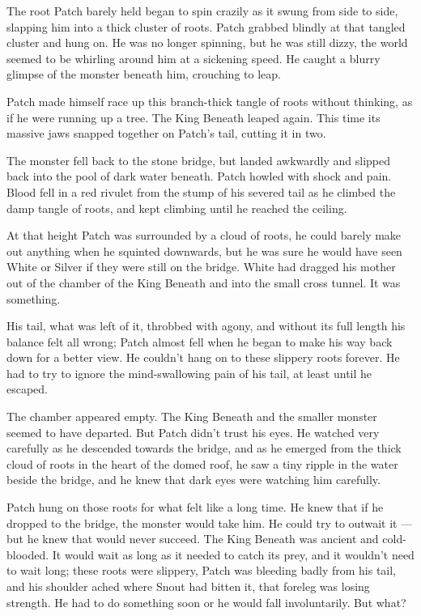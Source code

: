 \documentclass[12pt]{book}
\begin{document}
The root Patch barely held began to spin crazily as it swung from side
to side, slapping him into a thick cluster of roots. Patch grabbed
blindly at that tangled cluster and hung on. He was no longer
spinning, but he was still dizzy, the world seemed to be whirling
around him at a sickening speed. He caught a blurry glimpse of the
monster beneath him, crouching to leap.

Patch made himself race up this branch-thick tangle of roots without
thinking, as if he were running up a tree. The King Beneath leaped
again. This time its massive jaws snapped together on Patch's tail,
cutting it in two.

The monster fell back to the stone bridge, but landed awkwardly and
slipped back into the pool of dark water beneath. Patch howled with
shock and pain. Blood fell in a red rivulet from the stump of his
severed tail as he climbed the damp tangle of roots, and kept climbing
until he reached the ceiling.

At that height Patch was surrounded by a cloud of roots, he could
barely make out anything when he squinted downwards, but he was sure
he would have seen White or Silver if they were still on the
bridge. White had dragged his mother out of the chamber of the King
Beneath and into the small cross tunnel. It was something.

His tail, what was left of it, throbbed with agony, and without its
full length his balance felt all wrong; Patch almost fell when he
began to make his way back down for a better view. He couldn't hang on
to these slippery roots forever. He had to try to ignore the
mind-swallowing pain of his tail, at least until he escaped.

The chamber appeared empty. The King Beneath and the smaller monster
seemed to have departed. But Patch didn't trust his eyes. He watched
very carefully as he descended towards the bridge, and as he emerged
from the thick cloud of roots in the heart of the domed roof, he saw a
tiny ripple in the water beside the bridge, and he knew that dark eyes
were watching him carefully.

Patch hung on those roots for what felt like a long time. He knew that
if he dropped to the bridge, the monster would take him. He could try
to outwait it --- but he knew that would never succeed. The King
Beneath was ancient and cold-blooded. It would wait as long as it
needed to catch its prey, and it wouldn't need to wait long; these
roots were slippery, Patch was bleeding badly from his tail, and his
shoulder ached where Snout had bitten it, that foreleg was losing
strength. He had to do something soon or he would fall
involuntarily. But what?
\end{document}

